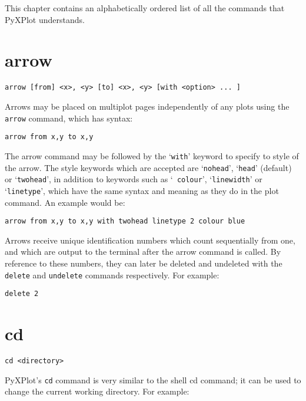 \documentclass[a4paper,onecolumn,11pt]{book}
\begin{document}
This chapter contains an alphabetically ordered list of all the commands that
PyXPlot understands.

\section{arrow}

\begin{verbatim}
arrow [from] <x>, <y> [to] <x>, <y> [with <option> ... ]
\end{verbatim}

Arrows may be placed on multiplot pages independently of any plots using the
{\tt arrow} command, which has syntax:

\begin{verbatim}
arrow from x,y to x,y
\end{verbatim}

The arrow command may be followed by the `{\tt with}' keyword to specify to
style of the arrow. The style keywords which are accepted are `{\tt nohead}',
`{\tt head}' (default) or `{\tt twohead}', in addition to keywords such as `{\tt
colour}', `{\tt linewidth}' or `{\tt linetype}', which have the same syntax and
meaning as they do in the plot command. An example would be:

\begin{verbatim}
arrow from x,y to x,y with twohead linetype 2 colour blue
\end{verbatim}

Arrows receive unique identification numbers which count sequentially from one,
and which are output to the terminal after the arrow command is called. By
reference to these numbers, they can later be deleted and undeleted with the
{\tt delete} and {\tt undelete} commands respectively. For example:

\begin{verbatim}
delete 2
\end{verbatim}

\section{cd}

\begin{verbatim}
cd <directory>
\end{verbatim}

PyXPlot's {\tt cd} command is very similar to the shell cd command; it can be used to
change the current working directory. For example:
\end{document}
